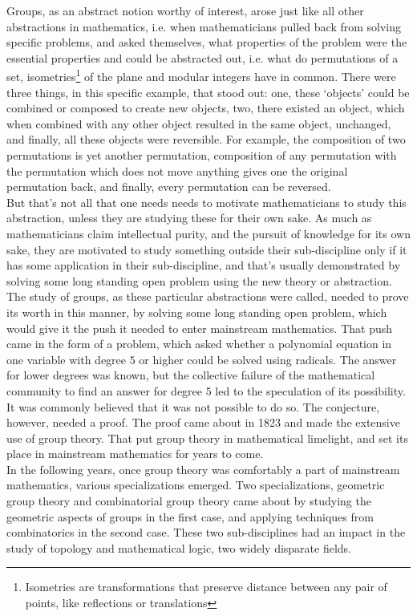 \documentclass[12pt, titlepage]{article}
\theoremstyle{definition}
\begin{document}
Groups, as an abstract notion worthy of interest, arose just like all other abstractions in mathematics, i.e. when mathematicians pulled back from solving specific problems, and asked themselves, what properties of the problem were the essential properties and could be abstracted out, i.e. what do permutations of a set, isometries\footnote{Isometries are transformations that preserve distance between any pair of points, like reflections or translations} of the plane and modular integers have in common. There were three things, in this specific example, that stood out: one, these `objects' could be combined or composed to create new objects, two, there existed an object, which when combined with any other object resulted in the same object, unchanged, and finally, all these objects were reversible. For example, the composition of two permutations is yet another permutation, composition of any permutation with the permutation which does not move anything gives one the original permutation back, and finally, every permutation can be reversed.\\
But that's not all that one needs needs to motivate mathematicians to study this abstraction, unless they are studying these for their own sake. As much as mathematicians claim intellectual purity, and the pursuit of knowledge for its own sake, they are motivated to study something outside their sub-discipline only if it has some application in their sub-discipline, and that's usually demonstrated by solving some long standing open problem using the new theory or abstraction.\\
The study of groups, as these particular abstractions were called, needed to prove its worth in this manner, by solving some long standing open problem, which would give it the push it needed to enter mainstream mathematics. That push came in the form of a problem, which asked whether a polynomial equation in one variable with degree $5$ or higher could be solved using radicals. The answer for lower degrees was known, but the collective failure of the mathematical community to find an answer for degree $5$ led to the speculation of its possibility. It was commonly believed that it was not possible to do so. The conjecture, however, needed a proof. The proof came about in 1823 and made the extensive use of group theory. That put group theory in mathematical limelight, and set its place in mainstream mathematics for years to come.\\
In the following years, once group theory was comfortably a part of mainstream mathematics, various specializations emerged. Two specializations, geometric group theory and combinatorial group theory came about by studying the geometric aspects of groups in the first case, and applying techniques from combinatorics in the second case. These two sub-disciplines had an impact in the study of topology and mathematical logic, two widely disparate fields.
\end{document}
